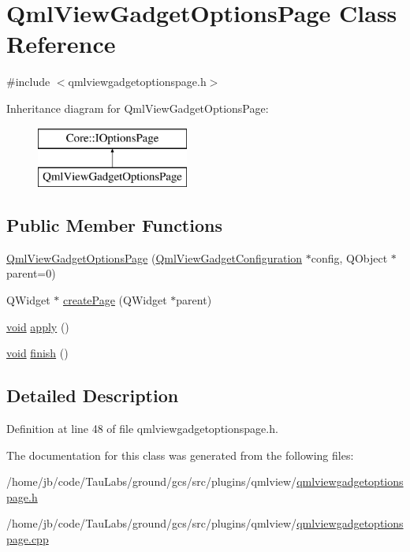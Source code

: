 \hypertarget{class_qml_view_gadget_options_page}{\section{\-Qml\-View\-Gadget\-Options\-Page \-Class \-Reference}
\label{class_qml_view_gadget_options_page}
}


{\ttfamily \#include $<$qmlviewgadgetoptionspage.\-h$>$}

\-Inheritance diagram for \-Qml\-View\-Gadget\-Options\-Page\-:\begin{figure}[H]
\begin{center}
\leavevmode
\includegraphics[height=2.000000cm]{class_qml_view_gadget_options_page}
\end{center}
\end{figure}
\subsection*{\-Public \-Member \-Functions}
\begin{DoxyCompactItemize}
\item 
\hyperlink{group___o_p_map_plugin_gaf6860d14e2ae756100a2765d50a6d9b0}{\-Qml\-View\-Gadget\-Options\-Page} (\hyperlink{class_qml_view_gadget_configuration}{\-Qml\-View\-Gadget\-Configuration} $\ast$config, \-Q\-Object $\ast$parent=0)
\item 
\-Q\-Widget $\ast$ \hyperlink{group___o_p_map_plugin_gabea978f47d48fc92ec7e5a0ed8d88fe0}{create\-Page} (\-Q\-Widget $\ast$parent)
\item 
\hyperlink{group___u_a_v_objects_plugin_ga444cf2ff3f0ecbe028adce838d373f5c}{void} \hyperlink{group___o_p_map_plugin_gae54bde0f44f72b28df2d9722d829d930}{apply} ()
\item 
\hyperlink{group___u_a_v_objects_plugin_ga444cf2ff3f0ecbe028adce838d373f5c}{void} \hyperlink{group___o_p_map_plugin_ga8730978634b18a85389188571ad7fec5}{finish} ()
\end{DoxyCompactItemize}


\subsection{\-Detailed \-Description}


\-Definition at line 48 of file qmlviewgadgetoptionspage.\-h.



\-The documentation for this class was generated from the following files\-:\begin{DoxyCompactItemize}
\item 
/home/jb/code/\-Tau\-Labs/ground/gcs/src/plugins/qmlview/\hyperlink{qmlviewgadgetoptionspage_8h}{qmlviewgadgetoptionspage.\-h}\item 
/home/jb/code/\-Tau\-Labs/ground/gcs/src/plugins/qmlview/\hyperlink{qmlviewgadgetoptionspage_8cpp}{qmlviewgadgetoptionspage.\-cpp}\end{DoxyCompactItemize}
